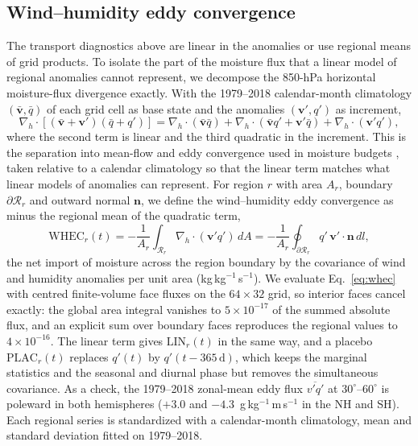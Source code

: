 \documentclass[preprint,12pt]{elsarticle}
\begin{document}
\subsection{Wind--humidity eddy convergence}
\label{subsec:whec}

The transport diagnostics above are linear in the anomalies or use regional means of grid products. To isolate the part of the moisture flux that a linear model of regional anomalies cannot represent, we decompose the 850-hPa horizontal moisture-flux divergence exactly. With the 1979--2018 calendar-month climatology $(\bar{\mathbf{v}},\bar{q})$ of each grid cell as base state and the anomalies $(\mathbf{v}',q')$ as increment,
\begin{equation}
\nabla_h\cdot\left[(\bar{\mathbf{v}}+\mathbf{v}')(\bar{q}+q')\right]=\nabla_h\cdot(\bar{\mathbf{v}}\bar{q})+\nabla_h\cdot(\bar{\mathbf{v}}q'+\mathbf{v}'\bar{q})+\nabla_h\cdot(\mathbf{v}'q'),
\label{eq:increment}
\end{equation}
where the second term is linear and the third quadratic in the increment. This is the separation into mean-flow and eddy convergence used in moisture budgets \citep{Tootoonchi2025Mediterranean}, taken relative to a calendar climatology so that the linear term matches what linear models of anomalies can represent. For region $r$ with area $A_r$, boundary $\partial\mathcal{R}_r$ and outward normal $\mathbf{n}$, we define the wind--humidity eddy convergence as minus the regional mean of the quadratic term,
\begin{equation}
\mathrm{WHEC}_r(t)=-\frac{1}{A_r}\int_{\mathcal{R}_r}\nabla_h\cdot(\mathbf{v}'q')\,dA=-\frac{1}{A_r}\oint_{\partial\mathcal{R}_r}q'\,\mathbf{v}'\cdot\mathbf{n}\,dl,
\label{eq:whec}
\end{equation}
the net import of moisture across the region boundary by the covariance of wind and humidity anomalies per unit area (kg\,kg$^{-1}$\,s$^{-1}$). We evaluate Eq.~\eqref{eq:whec} with centred finite-volume face fluxes on the $64\times32$ grid, so interior faces cancel exactly: the global area integral vanishes to $5\times10^{-17}$ of the summed absolute flux, and an explicit sum over boundary faces reproduces the regional values to $4\times10^{-16}$. The linear term gives $\mathrm{LIN}_r(t)$ in the same way, and a placebo $\mathrm{PLAC}_r(t)$ replaces $q'(t)$ by $q'(t-365\,\mathrm{d})$, which keeps the marginal statistics and the seasonal and diurnal phase but removes the simultaneous covariance. As a check, the 1979--2018 zonal-mean eddy flux $\overline{v'q'}$ at $30^\circ$--$60^\circ$ is poleward in both hemispheres ($+3.0$ and $-4.3$~g\,kg$^{-1}$\,m\,s$^{-1}$ in the NH and SH). Each regional series is standardized with a calendar-month climatology, mean and standard deviation fitted on 1979--2018.
\end{document}
